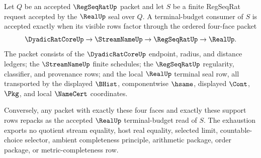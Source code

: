 \begin{theorem}
\label{thm:real-regseqrat-terminal-budget-exhaustion}
Let $Q$ be an accepted $\RegSeqRatUp$ packet and let $S$ be a finite RegSeqRat request accepted by the $\RealUp$ seal over $Q$. A terminal-budget consumer of $S$ is accepted exactly when its visible rows factor through the ordered four-face packet
$$
\DyadicRatCoreUp \to \StreamNameUp \to \RegSeqRatUp \to \RealUp .
$$
The packet consists of the $\DyadicRatCoreUp$ endpoint, radius, and distance ledgers; the $\StreamNameUp$ finite schedules; the $\RegSeqRatUp$ regularity, classifier, and provenance rows; and the local $\RealUp$ terminal seal row, all transported by the displayed $\BHist$, componentwise $\hsame$, displayed $\Cont$, $\Pkg$, and local $\NameCert$ coordinates.

Conversely, any packet with exactly these four faces and exactly these support rows repacks as the accepted $\RealUp$ terminal-budget read of $S$. The exhaustion exports no quotient stream equality, host real equality, selected limit, countable-choice selector, ambient completeness principle, arithmetic package, order package, or metric-completeness row.
\end{theorem}
